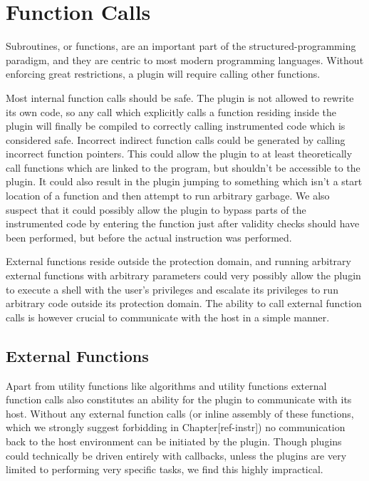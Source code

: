 \chapter {Function Calls}

Subroutines, or functions, are an important part of the structured-programming
paradigm, and they are centric to most modern programming languages.
Without enforcing great restrictions, a plugin will require calling other
functions.

Most internal function calls should be safe.
The plugin is not allowed to rewrite its own code, so any call which explicitly
calls a function residing inside the plugin will finally be compiled to
correctly calling instrumented code which is considered safe.
Incorrect indirect function calls could be
generated by calling incorrect function pointers.
This could allow the plugin to at least theoretically call functions which are
linked to the program, but shouldn't be accessible to the plugin.
It could also result in the plugin jumping to something which isn't a start
location of a function and then attempt to run arbitrary garbage.
We also suspect that it could possibly allow the plugin to bypass parts of the
instrumented code by entering the function just after validity checks should
have been performed, but before the actual instruction was performed.

External functions reside outside the protection domain, and running arbitrary
external functions with arbitrary parameters could very possibly allow the
plugin to execute a shell with the user's privileges and escalate its privileges
to run arbitrary code outside its protection domain.
The ability to call external function calls is however crucial to communicate
with the host in a simple manner.


\section {External Functions}

Apart from utility functions like algorithms and utility functions external
function calls also constitutes an ability for the plugin to communicate with
its host.
Without any external function calls (or inline assembly of these functions,
which we strongly suggest forbidding in Chapter[ref-instr]) no communication
back to the host environment can be initiated by the plugin.
Though plugins could technically be driven entirely with callbacks, unless the
plugins are very limited to performing very specific tasks, we find this highly
impractical.

